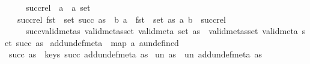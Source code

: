 \begin{isabellebody}
\ \ \ \ \ succ{\isacharunderscore}{\kern0pt}rel\ {\isacharcolon}{\kern0pt}{\isacharcolon}{\kern0pt}\ {\isachardoublequoteopen}{\isacharparenleft}{\kern0pt}{\isacharprime}{\kern0pt}a\ {\isacharasterisk}{\kern0pt}\ {\isacharprime}{\kern0pt}a{\isacharparenright}{\kern0pt}\ set{\isachardoublequoteclose}\isanewline
\ \ \ succ{\isacharunderscore}{\kern0pt}rel{\isacharcolon}{\kern0pt}\ {\isachardoublequoteopen}fst\ {\isacharbackquote}{\kern0pt}\ {\isacharparenleft}{\kern0pt}set\ {\isacharparenleft}{\kern0pt}succ\ as{\isacharparenright}{\kern0pt}{\isacharparenright}{\kern0pt}\ {\isacharequal}{\kern0pt}\ {\isacharbraceleft}{\kern0pt}b{\isachardot}{\kern0pt}\ {\isasymexists}a\ {\isasymin}\ fst\ {\isacharbackquote}{\kern0pt}\ {\isacharparenleft}{\kern0pt}set\ as{\isacharparenright}{\kern0pt}{\isachardot}{\kern0pt}\ {\isacharparenleft}{\kern0pt}a{\isacharcomma}{\kern0pt}\ b{\isacharparenright}{\kern0pt}\ {\isasymin}\ succ{\isacharunderscore}{\kern0pt}rel{\isacharbraceright}{\kern0pt}{\isachardoublequoteclose}\isanewline
\ \ \ \ \ succ{\isacharunderscore}{\kern0pt}valid{\isacharunderscore}{\kern0pt}metas{\isacharcolon}{\kern0pt}\ {\isachardoublequoteopen}valid{\isacharunderscore}{\kern0pt}metas{\isacharunderscore}{\kern0pt}set\ valid{\isacharunderscore}{\kern0pt}meta\ {\isacharparenleft}{\kern0pt}set\ as{\isacharparenright}{\kern0pt}\ {\isasymLongrightarrow}\ valid{\isacharunderscore}{\kern0pt}metas{\isacharunderscore}{\kern0pt}set\ valid{\isacharunderscore}{\kern0pt}meta\ {\isacharparenleft}{\kern0pt}set\ {\isacharparenleft}{\kern0pt}succ\ as{\isacharparenright}{\kern0pt}{\isacharparenright}{\kern0pt}{\isachardoublequoteclose}\isanewline
{}\isanewline
\isanewline
{}\isamarkupfalse%
\ {\isachardoublequoteopen}add{\isacharunderscore}{\kern0pt}undef{\isacharunderscore}{\kern0pt}meta\ {\isasymequiv}\ map\ {\isacharparenleft}{\kern0pt}{\isasymlambda}a{\isachardot}{\kern0pt}\ {\isacharparenleft}{\kern0pt}a{\isacharcomma}{\kern0pt}undefined{\isacharparenright}{\kern0pt}{\isacharparenright}{\kern0pt}{\isachardoublequoteclose}\isanewline
\isanewline
{}\isamarkupfalse%
\ {\isachardoublequoteopen}succ{\isacharprime}{\kern0pt}\ as\ {\isasymequiv}\ keys\ {\isacharparenleft}{\kern0pt}succ\ {\isacharparenleft}{\kern0pt}add{\isacharunderscore}{\kern0pt}undef{\isacharunderscore}{\kern0pt}meta\ as{\isacharparenright}{\kern0pt}{\isacharparenright}{\kern0pt}{\isachardoublequoteclose}\isanewline
\isanewline
{}\isamarkupfalse%
\ {\isachardoublequoteopen}un{\isacharprime}{\kern0pt}\ as\ {\isasymequiv}\ un\ {\isacharparenleft}{\kern0pt}add{\isacharunderscore}{\kern0pt}undef{\isacharunderscore}{\kern0pt}meta\ as{\isacharparenright}{\kern0pt}{\isachardoublequoteclose}\isanewline

\end{isabellebody}
